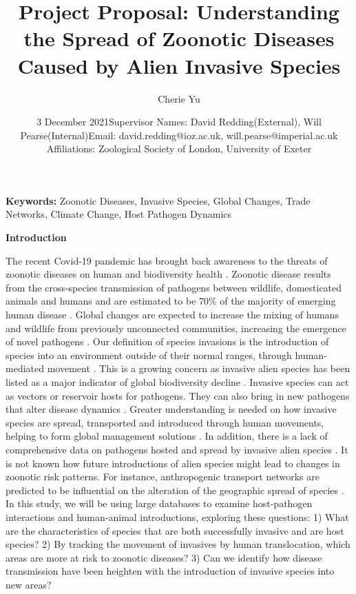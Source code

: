 \documentclass[11pt]{article}
\title{Project Proposal: Understanding the Spread of Zoonotic Diseases Caused by Alien Invasive Species}
\author{Cherie Yu}
\date{3 December 2021\linebreak Supervisor Names: David Redding(External), Will Pearse(Internal)\linebreak Email: david.redding@ioz.ac.uk, will.pearse@imperial.ac.uk \linebreak Affiliations: Zoological Society of London, University of Exeter}
\begin{document}
\maketitle

\pagebreak
\noindent\textbf{Keywords:} Zoonotic Diseases, Invasive Species, Global Changes, Trade Networks, Climate Change, Host Pathogen Dynamics 

\linenumbers
\noindent\textbf{Introduction} 

The recent Covid-19 pandemic has brought back awareness to the threats of zoonotic diseases on human and biodiversity 
health \cite{stephens_characteristics_2021,tedeschi_introduction_nodate}. 
Zoonotic disease results from the cross-species transmission of pathogens between wildlife, domesticated animals 
and humans and are estimated to be 70\% of the majority of emerging human disease \cite{stephens_characteristics_2021,tedeschi_introduction_nodate}. 
Global changes are expected to increase the mixing of humans and wildlife from previously unconnected communities, increasing the emergence of novel pathogens 
\cite{glidden_human-mediated_2021,chapman_global_2017,michael_r_lelimini_invasive_2021,robinson_double_2020,pysek_scientists_2020,ogden_emerging_nodate}.
Our definition of species invasions is the introduction of species into an environment outside of their normal ranges, through 
human-mediated movement \cite{chinchio_invasive_2020}. This is a growing concern as invasive alien species has been listed as a 
major indicator of global biodiversity decline \cite{pysek_scientists_2020,michael_r_lelimini_invasive_2021}. Invasive species 
can act as vectors or reservoir hosts for pathogens. They can also bring in new pathogens that alter disease dynamics \cite{glidden_human-mediated_2021}. Greater understanding is 
needed on how invasive species are spread, transported and introduced through human movements, helping to form global management 
solutions \cite{schindler_alien_2015}. In addition, there is a lack of comprehensive data on pathogens hosted and spread by 
invasive alien species \cite{chinchio_invasive_2020}. It is not known how future 
introductions of alien species might lead to changes in zoonotic risk patterns. For instance, anthropogenic transport networks 
are predicted to be influential on the alteration of the geographic spread of species \cite{chapman_global_2017}. 
In this study, we will be using large databases to examine host-pathogen interactions and human-animal introductions, exploring these questions: 
1) What are the characteristics of species that are both successfully invasive and 
are host species? 2) By tracking the movement of invasives by human translocation, which areas 
are more at risk to zoonotic diseases? 3) Can we identify how disease transmission have been heighten with the introduction of invasive species into new areas? 
\end{document}
